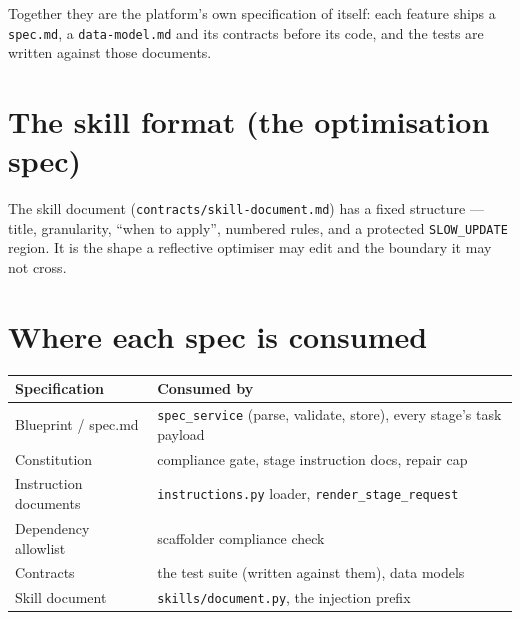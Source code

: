 \documentclass[11pt,a4paper]{article}
\begin{document}
Together they are the platform's own specification of itself: each feature ships a
\texttt{spec.md}, a \texttt{data-model.md} and its contracts before its code, and the
tests are written against those documents.

\section{The skill format (the optimisation spec)}

The skill document (\texttt{contracts/skill-document.md}) has a fixed structure ---
title, granularity, ``when to apply'', numbered rules, and a protected
\texttt{SLOW\_UPDATE} region. It is the shape a reflective optimiser may edit and the
boundary it may not cross.

\section{Where each spec is consumed}

\begin{center}
\begin{longtable}{@{}p{}p{}@{}}
\toprule
\textbf{Specification} & \textbf{Consumed by} \\
\midrule
Blueprint / spec.md & \texttt{spec\_service} (parse, validate, store), every stage's task payload \\
Constitution & compliance gate, stage instruction docs, repair cap \\
Instruction documents & \texttt{instructions.py} loader, \texttt{render\_stage\_request} \\
Dependency allowlist & scaffolder compliance check \\
Contracts & the test suite (written against them), data models \\
Skill document & \texttt{skills/document.py}, the injection prefix \\
\bottomrule
\end{longtable}
\end{center}
\end{document}
